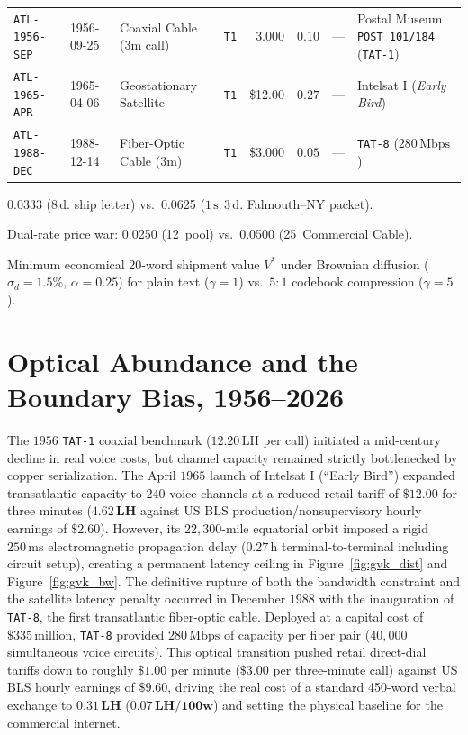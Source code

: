 \documentclass[11pt,a4paper]{article}
\newcommand{\gbp}{\symbol{"00A3}}
\newcommand{\ct}{\symbol{"00A2}}
\begin{document}
\begin{table}[htbp]
\begin{threeparttable}
\begin{tabularx}{\textwidth}{@{}llllrrrX@{}}
\texttt{ATL-1956-SEP} & 1956-09-25 & Coaxial Cable (3m call) & \texttt{T1} & \gbp 3.000 & $0.10$ & --- & Postal Museum \texttt{POST 101/184} (\texttt{TAT-1}) \\
\texttt{ATL-1965-APR} & 1965-04-06 & Geostationary Satellite & \texttt{T1} & \$12.00 & $0.27$ & --- & Intelsat I (\textit{Early Bird}) \\
\texttt{ATL-1988-DEC} & 1988-12-14 & Fiber-Optic Cable (3m) & \texttt{T1} & \$3.000 & $0.05$ & --- & \texttt{TAT-8} ($280\,\text{Mbps}$) \\
\bottomrule
\end{tabularx}
\begin{tablenotes}[flushleft]
\scriptsize
\item[a] \gbp 0.0333 ($8\,\text{d.}$ ship letter) vs.\ \gbp 0.0625 ($1\,\text{s.}\,3\,\text{d.}$ Falmouth--NY packet).
\item[b] Dual-rate price war: \gbp 0.0250 (12\ct\ pool) vs.\ \gbp 0.0500 (25\ct\ Commercial Cable).
\item[c] Minimum economical 20-word shipment value $V^*$ under Brownian diffusion ($\sigma_d = 1.5\%$, $\alpha = 0.25$) for plain text ($\gamma = 1$) vs.\ $5{:}1$ codebook compression ($\gamma = 5$).
\end{tablenotes}
\end{threeparttable}
\end{table}

\section{Optical Abundance and the Boundary Bias, 1956--2026}
\label{sec:optical}

The $1956$ \texttt{TAT-1} coaxial benchmark ($12.20\,\text{LH}$ per call) initiated a mid-century decline in real voice costs, but channel capacity remained strictly bottlenecked by copper serialization. The April $1965$ launch of Intelsat I (``Early Bird'') expanded transatlantic capacity to $240$ voice channels at a reduced retail tariff of $\$12.00$ for three minutes ($\mathbf{4.62\,\text{LH}}$ against US BLS production/nonsupervisory hourly earnings of $\$2.60$). However, its $22,300$-mile equatorial orbit imposed a rigid $250\,\text{ms}$ electromagnetic propagation delay ($0.27\,\text{h}$ terminal-to-terminal including circuit setup), creating a permanent latency ceiling in Figure~\ref{fig:gvk_dist} and Figure~\ref{fig:gvk_bw}. The definitive rupture of both the bandwidth constraint and the satellite latency penalty occurred in December $1988$ with the inauguration of \texttt{TAT-8}, the first transatlantic fiber-optic cable. Deployed at a capital cost of $\$335\,\text{million}$, \texttt{TAT-8} provided $280\,\text{Mbps}$ of capacity per fiber pair ($40,000$ simultaneous voice circuits). This optical transition pushed retail direct-dial tariffs down to roughly $\$1.00$ per minute ($\$3.00$ per three-minute call) against US BLS hourly earnings of $\$9.60$, driving the real cost of a standard 450-word verbal exchange to $\mathbf{0.31\,\text{LH}}$ ($\mathbf{0.07\,\text{LH/100w}}$) and setting the physical baseline for the commercial internet.
\end{document}
